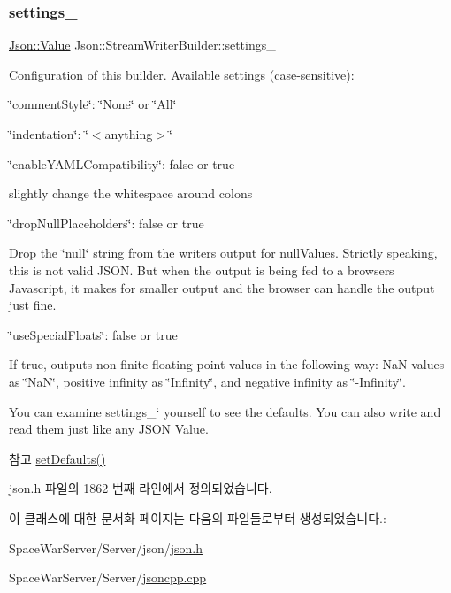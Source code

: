 \subsubsection{\texorpdfstring{settings\+\_\+}{settings\_}}
{\footnotesize\ttfamily \hyperlink{class_json_1_1_value}{Json\+::\+Value} Json\+::\+Stream\+Writer\+Builder\+::settings\+\_\+}

Configuration of this builder. Available settings (case-\/sensitive)\+:
\begin{DoxyItemize}
\item \char`\"{}comment\+Style\char`\"{}\+: \char`\"{}\+None\char`\"{} or \char`\"{}\+All\char`\"{}
\item \char`\"{}indentation\char`\"{}\+: \char`\"{}$<$anything$>$\char`\"{}
\item \char`\"{}enable\+Y\+A\+M\+L\+Compatibility\char`\"{}\+: false or true
\begin{DoxyItemize}
\item slightly change the whitespace around colons
\end{DoxyItemize}
\item \char`\"{}drop\+Null\+Placeholders\char`\"{}\+: false or true
\begin{DoxyItemize}
\item Drop the \char`\"{}null\char`\"{} string from the writer\textquotesingle{}s output for null\+Values. Strictly speaking, this is not valid J\+S\+ON. But when the output is being fed to a browser\textquotesingle{}s Javascript, it makes for smaller output and the browser can handle the output just fine.
\end{DoxyItemize}
\item \char`\"{}use\+Special\+Floats\char`\"{}\+: false or true
\begin{DoxyItemize}
\item If true, outputs non-\/finite floating point values in the following way\+: NaN values as \char`\"{}\+Na\+N\char`\"{}, positive infinity as \char`\"{}\+Infinity\char`\"{}, and negative infinity as \char`\"{}-\/\+Infinity\char`\"{}.
\end{DoxyItemize}
\end{DoxyItemize}

You can examine \textquotesingle{}settings\+\_\+` yourself to see the defaults. You can also write and read them just like any J\+S\+ON \hyperlink{class_json_1_1_value}{Value}. \begin{DoxySeeAlso}{참고}
\hyperlink{class_json_1_1_stream_writer_builder_a53bf106b141e28637b01ad0ecd2acbf6}{set\+Defaults()} 
\end{DoxySeeAlso}


json.\+h 파일의 1862 번째 라인에서 정의되었습니다.



이 클래스에 대한 문서화 페이지는 다음의 파일들로부터 생성되었습니다.\+:\begin{DoxyCompactItemize}
\item 
Space\+War\+Server/\+Server/json/\hyperlink{json_8h}{json.\+h}\item 
Space\+War\+Server/\+Server/\hyperlink{jsoncpp_8cpp}{jsoncpp.\+cpp}\end{DoxyCompactItemize}
